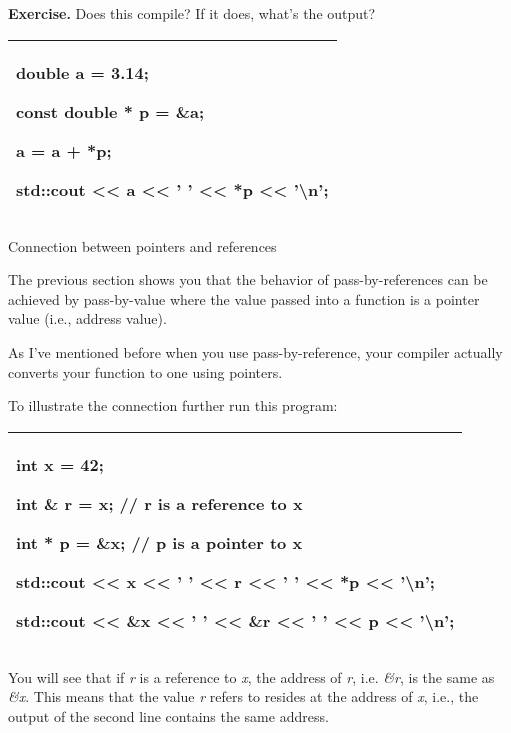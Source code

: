\documentclass[
]{article}
\begin{document}
\textbf{Exercise.} Does this compile? If it does, what's the output?

\begin{longtable}[]{@{}l@{}}
\toprule
\endhead
\begin{minipage}[t]{0.97\columnwidth}\raggedright
double a = 3.14;

const double * p = \&a;

a = a + *p;

std::cout \textless\textless{} a \textless\textless{} ' '
\textless\textless{} *p \textless\textless{} '\textbackslash n';\strut
\end{minipage}\tabularnewline
\bottomrule
\end{longtable}

Connection between pointers and references

The previous section shows you that the behavior of pass-by-references
can be achieved by pass-by-value where the value passed into a function
is a pointer value (i.e., address value).

As I've mentioned before when you use pass-by-reference, your compiler
actually converts your function to one using pointers.

To illustrate the connection further run this program:

\begin{longtable}[]{@{}l@{}}
\toprule
\endhead
\begin{minipage}[t]{0.97\columnwidth}\raggedright
int x = 42;

int \& r = x; // r is a reference to x

int * p = \&x; // p is a pointer to x

std::cout \textless\textless{} x \textless\textless{} ' '
\textless\textless{} r \textless\textless{} ' ' \textless\textless{} *p
\textless\textless{} '\textbackslash n';

std::cout \textless\textless{} \&x \textless\textless{} ' '
\textless\textless{} \&r \textless\textless{} ' ' \textless\textless{} p
\textless\textless{} '\textbackslash n';\strut
\end{minipage}\tabularnewline
\bottomrule
\end{longtable}

You will see that if \emph{r} is a reference to \emph{x}, the address of
\emph{r}, i.e. \emph{\&r}, is the same as \emph{\&x}. This means that
the value \emph{r} refers to resides at the address of \emph{x}, i.e.,
the output of the second line contains the same address.
\end{document}
